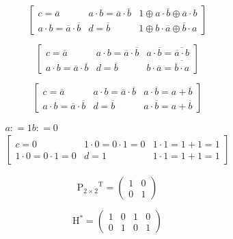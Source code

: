 \documentclass[
]{article}
\begin{document}
\begin{enumerate}
\begin{enumerate}
\begin{enumerate}
\begin{enumerate}
        \[\begin{bmatrix}
        {c = \overline{a}} & {{a \cdot b} = {\overline{a} \cdot \overline{b}}} & {1 \oplus {a \cdot \overline{b}} \oplus {\overline{a} \cdot b}} \\
        {{a \cdot b} = {\overline{a} \cdot \overline{b}}} & {d = \overline{b}} & {1 \oplus {b \cdot \overline{a}} \oplus {\overline{b} \cdot a}}
        \end{bmatrix}\]

        \[\begin{bmatrix}
        {c = \overline{a}} & {{a \cdot b} = {\overline{a} \cdot \overline{b}}} & {{a \cdot \overline{b}} = \overline{\overline{a}\cdot b}} \\
        {{a \cdot b} = {\overline{a} \cdot \overline{b}}} & {d = \overline{b}} & {{b \cdot \overline{a}} = \overline{\overline{b}\cdot a}}
        \end{bmatrix}\]

        \[\begin{bmatrix}
        {c = \overline{a}} & {{a \cdot b} = {\overline{a} \cdot \overline{b}}} & {{a \cdot \overline{b}} = {a + \overline{b}}} \\
        {{a \cdot b} = {\overline{a} \cdot \overline{b}}} & {d = \overline{b}} & {{a \cdot \overline{b}} = {a + \overline{b}}}
        \end{bmatrix}\]

        \[\begin{matrix}
        {a{: = 1}b{: = 0}} \\
        \begin{bmatrix}
        {c = 0} & {{{1 \cdot 0} = {0 \cdot 1}} = 0} & {{{1 \cdot 1} = {1 + 1}} = 1} \\
        {{{1 \cdot 0} = {0 \cdot 1}} = 0} & {d = 1} & {{{1 \cdot 1} = {1 + 1}} = 1}
        \end{bmatrix}
        \end{matrix}\]

        \[\mathtt{\mathrm{{P_{2 \times 2}}^{\mathtt{\mathbf{\mathrm{T}}}}}} = \begin{pmatrix}
        1 & 0 \\
        0 & 1
        \end{pmatrix}\]

        \[\mathtt{\mathrm{H^{\mathtt{\mathbf{\mathrm{\ast}}}}}} = \begin{pmatrix}
        1 & 0 & 1 & 0 \\
        0 & 1 & 0 & 1
        \end{pmatrix}\]


\end{enumerate}
\end{enumerate}
\end{enumerate}
\end{enumerate}
\end{document}
